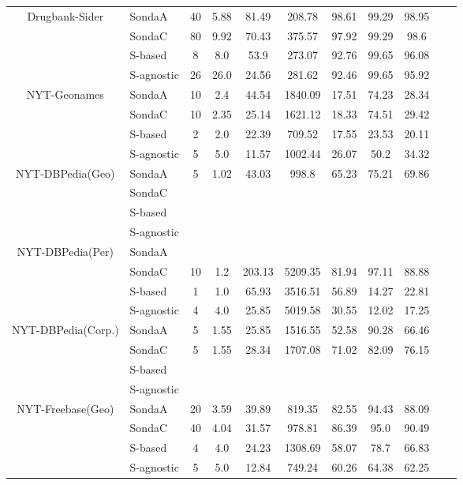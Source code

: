 \begin{center}
\begin{table*}[h]
\begin{tabular}{|c|l|c|c|c|c|c|c|c|c|c|}
\multirow{4}{*}{Drugbank-Sider} & SondaA    & 40 & 5.88   & 81.49  & 208.78    & 98.61 & 99.29 & 98.95 \\
											& SondaC	   & 80 & 9.92   & 70.43  & 375.57  & 97.92 & 99.29 & 98.6 \\
											& S-based     & 8 & 8.0   & 53.9  & 273.07  & 92.76 & 99.65 & 96.08\\
 											& S-agnostic   & 26 & 26.0   & 24.56  & 281.62   & 92.46 & 99.65 & 95.92 \\ \hline 											 

\multirow{4}{*}{NYT-Geonames} & SondaA     & 10 & 2.4   & 44.54  & 1840.09 & 17.51 & 74.23 & 28.34 \\
											& SondaC   & 10 & 2.35   & 25.14  & 1621.12 & 18.33 & 74.51 & 29.42 \\
											& S-based   & 2 & 2.0   & 22.39  & 709.52 & 17.55 & 23.53 & 20.11  \\
 											& S-agnostic    & 5 & 5.0   & 11.57  & 1002.44  & 26.07 & 50.2 & 34.32  \\ \hline 											


\multirow{4}{*}{NYT-DBPedia(Geo)} & SondaA    & 5 & 1.02   & 43.03  & 998.8  & 65.23 & 75.21 & 69.86 \\
											& SondaC  \\
											& S-based \\
 											& S-agnostic       \\ \hline 											
 		
\multirow{4}{*}{NYT-DBPedia(Per)} & SondaA   \\
											& SondaC   & 10 & 1.2   & 203.13  & 5209.35 & 81.94 & 97.11 & 88.88 \\
											& S-based  & 1 & 1.0   & 65.93  & 3516.51  & 56.89 & 14.27 & 22.81 \\
 											& S-agnostic     & 4 & 4.0   & 25.85  & 5019.58   & 30.55 & 12.02 & 17.25  \\ \hline 			
 																			
\multirow{4}{*}{NYT-DBPedia(Corp.)} & SondaA     & 5 & 1.55   & 25.85  & 1516.55 & 52.58 & 90.28 & 66.46\\
											& SondaC    & 5 & 1.55   & 28.34  & 1707.08 & 71.02 & 82.09 & 76.15\\
											& S-based  \\
 											& S-agnostic       \\ \hline 		 		
 		
\multirow{4}{*}{NYT-Freebase(Geo)} & SondaA  & 20 & 3.59   & 39.89  & 819.35     & 82.55 & 94.43 & 88.09 \\
											& SondaC    & 40 & 4.04   & 31.57  & 978.81   & 86.39 & 95.0 & 90.49\\
											& S-based     & 4 & 4.0   & 24.23  & 1308.69   & 58.07 & 78.7 & 66.83\\
 											& S-agnostic    & 5 & 5.0   & 12.84  & 749.24    & 60.26 & 64.38 & 62.25   \\ \hline 											
 


\end{tabular}
\end{table*}
\end{center}
